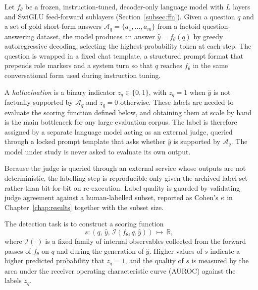 Let $f_\theta$ be a frozen, instruction-tuned, decoder-only language model
with $L$ layers and SwiGLU feed-forward sublayers
(Section~\ref{subsec:ffn}). Given a question $q$ and a set of gold
short-form answers $\mathcal{A}_q = \{a_1, \ldots, a_m\}$ from a factoid
question-answering dataset, the model produces an answer
$\hat{y} = f_\theta(q)$ by greedy autoregressive decoding, selecting the
highest-probability token at each step. The question is wrapped in a fixed
chat template, a structured prompt format that prepends role markers and a
system turn so that $q$ reaches $f_\theta$ in the same conversational form
used during instruction tuning.

A \emph{hallucination} is a binary indicator $z_q \in \{0, 1\}$, with
$z_q = 1$ when $\hat{y}$ is not factually supported by $\mathcal{A}_q$ and
$z_q = 0$ otherwise. These labels are needed to evaluate the scoring
function defined below, and obtaining them at scale by hand is the main
bottleneck for any large evaluation corpus. The label is therefore assigned
by a separate language model acting as an external judge, queried through a
locked prompt template that asks whether $\hat{y}$ is supported by
$\mathcal{A}_q$. The model under study is never asked to evaluate its own output.

Because the judge is queried through an external service whose outputs are
not deterministic, the labelling step is reproducible only given the
archived label set rather than bit-for-bit on re-execution. Label quality
is guarded by validating judge agreement against a human-labelled subset,
reported as Cohen's $\kappa$ in Chapter~\ref{chap:results} together
with the subset size.

The detection task is to construct a scoring function
\begin{equation}
    s : (q,\,\hat{y},\,\mathcal{I}(f_\theta, q, \hat{y}))
    \,\longmapsto\, \mathbb{R},
    \label{eq:detection_function}
\end{equation}
where $\mathcal{I}(\cdot)$ is a fixed family of internal observables
collected from the forward passes of $f_\theta$ on $q$ and during the
generation of $\hat{y}$. Higher values of $s$ indicate a higher predicted
probability that $z_q = 1$, and the quality of $s$ is measured by the area
under the receiver operating characteristic curve (AUROC) against the
labels $z_q$.

